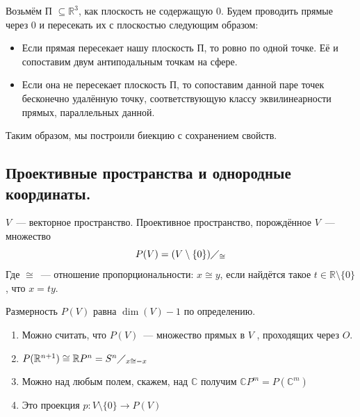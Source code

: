 \documentclass[11pt]{article}
\begin{document}
    Возьмём П $\subseteq \mathbb{R}^3$, как плоскость не содержащую $0$. Будем проводить прямые через $0$ и пересекать их с плоскостью следующим образом:
    \begin{itemize}
        \item Если прямая пересекает нашу плоскость П, то ровно по одной точке. Её и сопоставим двум антиподальным точкам на сфере.
        \item Если она не пересекает плоскость П, то сопоставим данной паре точек бесконечно удалённую точку, соответствующую классу эквилинеарности прямых, параллельных данной.
    \end{itemize}

    \begin{remark}
        Таким образом, мы построили биекцию с сохранением свойств.
    \end{remark}
    \subsection{Проективные пространства и однородные координаты.}
    \begin{definition}
        $V$~--- векторное пространство. Проективное пространство, порождённое $V$~--- множество
        \begin{equation*}
            P(V) = (V \setminus \{0\}) \diagup_{\cong}
        \end{equation*}
        Где $\cong$~--- отношение пропорциональности: $x \cong y$, если найдётся такое $t \in \mathbb{R} \setminus \{0\}$, что $x = ty$.
    \end{definition}

    \begin{remark}
        Размерность $P(V)$ равна $\dim(V) - 1$ по определению.
    \end{remark}

    \begin{remark}
        \begin{enumerate}
            \item Можно считать, что $P(V)$~--- множество прямых в $V$ , проходящих через $O$.
            \item $P(\mathbb{R}^{n + 1}) \cong \mathbb{R}P^{n} = S^n \diagup_{x \cong -x}$
            \item Можно над любым полем, скажем, над $\mathbb{C}$ получим $\mathbb{C}P^m = P(\mathbb{C}^m)$
            \item Это проекция $p: V \setminus \{0\} \to P(V)$
        \end{enumerate}
    \end{remark}
\end{document}
